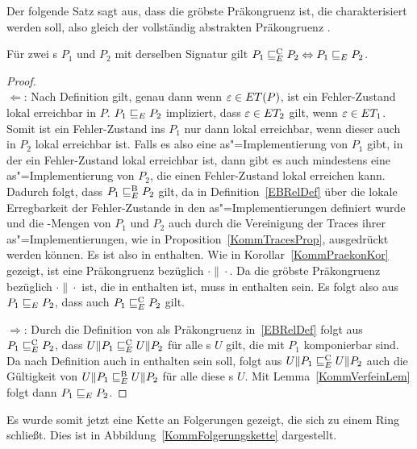 Der folgende Satz sagt aus, dass \ERel{} die gröbste Präkongruenz ist, die
charakterisiert werden soll, also gleich der vollständig abstrakten
Präkongruenz \ECRel{}.

\begin{Satz}
  \label{KommVollAbstraktSatz}
  Für zwei \MEIO{}s $P_1$ und $P_2$ mit derselben Signatur gilt $P_1 \sqsubseteq  _E^\mathrm{C}
  P_2\Leftrightarrow P_1 \sqsubseteq  _E{} P_2$.
\end{Satz}
\begin{proof}\mbox{}\\
  \glqq$\Leftarrow$\grqq: Nach Definition gilt, genau dann wenn
  $\varepsilon\in ET (P)$, ist ein Fehler-Zustand lokal erreichbar in $P$. $P_1
   \sqsubseteq  _E P_2$ impliziert, dass $\varepsilon\in ET _2$ gilt, wenn
  $\varepsilon\in ET _1$. Somit ist ein Fehler-Zustand ins $P_1$ nur dann lokal
  erreichbar, wenn dieser auch in $P_2$ lokal erreichbar ist. Falls es also
  eine as"=Implementierung von $P_1$ gibt, in der ein Fehler-Zustand lokal
  erreichbar ist, dann gibt es auch mindestens eine as"=Implementierung von
  $P_2$, die einen Fehler-Zustand lokal erreichen kann. Dadurch folgt,
  dass $P_1 \sqsubseteq  _E^\mathrm{B} P_2$ gilt, da \EBRel{} in Definition~\ref{EBRelDef} über die
  lokale Erregbarkeit der Fehler-Zustande in den as"=Implementierungen
  definiert wurde und die \ET{}-Mengen von $P_1$ und $P_2$ auch durch die
  Vereinigung der Traces ihrer as"=Implementierungen, wie in
  Proposition~\ref{KommTracesProp}, ausgedrückt werden können. Es ist also
  \ERel{} in \EBRel{} enthalten. Wie in Korollar~\ref{KommPraekonKor} gezeigt,
  ist \ERel{} eine Präkongruenz bezüglich $\cdot\|\cdot$. Da \ECRel{} die
  gröbste Präkongruenz bezüglich $\cdot\|\cdot$ ist, die in \EBRel{} enthalten
  ist, muss \ERel{} in \ECRel{} enthalten sein. Es folgt also aus $P_1 \sqsubseteq  _E{}
  P_2$, dass auch $P_1 \sqsubseteq  _E^\mathrm{C}{} P_2$ gilt.

  \glqq$\Rightarrow$\grqq: Durch die Definition von \ECRel{} als Präkongruenz
  in~\ref{EBRelDef} folgt aus $P_1 \sqsubseteq  _E^\mathrm{C}{} P_2$, dass $U\|P_1 \sqsubseteq  _E^\mathrm{C} U\|P_2$ für
  alle \MEIO{}s $U$ gilt, die mit $P_1$ komponierbar sind. Da \ECRel{} nach
  Definition auch in \EBRel{} enthalten sein soll, folgt aus $U\|P_1 \sqsubseteq  _E^\mathrm{C}{}
  U\|P_2$ auch die Gültigkeit von $U\|P_1 \sqsubseteq  _E^\mathrm{B}{}U\|P_2$ für alle diese
  \MEIO{}s $U$. Mit Lemma~\ref{KommVerfeinLem} folgt dann $P_1 \sqsubseteq  _E{} P_2$.
\end{proof}

Es wurde somit jetzt eine Kette an Folgerungen gezeigt, die sich zu einem Ring
schließt. Dies ist in Abbildung~\ref{KommFolgerungskette} dargestellt.

